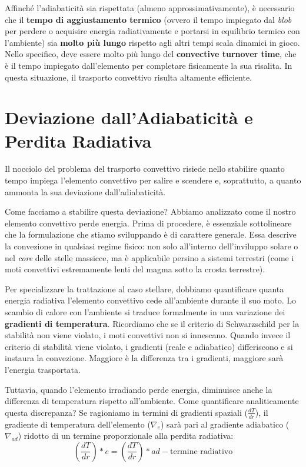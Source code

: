 Affinché l'adiabaticità sia rispettata (almeno approssimativamente), è necessario che il \textbf{tempo di aggiustamento termico} (ovvero il tempo impiegato dal \textit{blob} per perdere o acquisire energia radiativamente e portarsi in equilibrio termico con l'ambiente) sia \textbf{molto più lungo} rispetto agli altri tempi scala dinamici in gioco. Nello specifico, deve essere molto più lungo del \textbf{convective turnover time}, che è il tempo impiegato dall'elemento per completare fisicamente la sua risalita. In questa situazione, il trasporto convettivo risulta altamente efficiente.

\section{Deviazione dall'Adiabaticità e Perdita Radiativa}

Il nocciolo del problema del trasporto convettivo risiede nello stabilire quanto tempo impiega l'elemento convettivo per salire e scendere e, soprattutto, a quanto ammonta la sua deviazione dall'adiabaticità.

Come facciamo a stabilire questa deviazione? Abbiamo analizzato come il nostro elemento convettivo perde energia.
Prima di procedere, è essenziale sottolineare che la formulazione che stiamo sviluppando è di carattere generale. Essa descrive la convezione in qualsiasi regime fisico: non solo all'interno dell'inviluppo solare o nel \textit{core} delle stelle massicce, ma è applicabile persino a sistemi terrestri (come i moti convettivi estremamente lenti del magma sotto la crosta terrestre).

Per specializzare la trattazione al caso stellare, dobbiamo quantificare quanta energia radiativa l'elemento convettivo cede all'ambiente durante il suo moto.
Lo scambio di calore con l'ambiente si traduce formalmente in una variazione dei \textbf{gradienti di temperatura}.
Ricordiamo che se il criterio di Schwarzschild per la stabilità non viene violato, i moti convettivi non si innescano. Quando invece il criterio di stabilità viene violato, i gradienti (reale e adiabatico) differiscono e si instaura la convezione. Maggiore è la differenza tra i gradienti, maggiore sarà l'energia trasportata.

Tuttavia, quando l'elemento irradiando perde energia, diminuisce anche la differenza di temperatura rispetto all'ambiente. Come quantificare analiticamente questa discrepanza?
Se ragioniamo in termini di gradienti spaziali ($\frac{dT}{dr}$), il gradiente di temperatura dell'elemento ($\nabla_e$) sarà pari al gradiente adiabatico ($\nabla_{ad}$) ridotto di un termine proporzionale alla perdita radiativa:
\begin{equation}
\left( \frac{dT}{dr} \right)*e = \left( \frac{dT}{dr} \right)*{ad} - \text{termine radiativo}
\end{equation}

